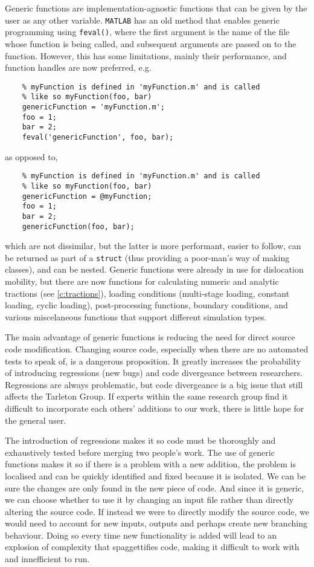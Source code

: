 Generic functions are implementation-agnostic functions that can be given by the user as any other variable. \texttt{MATLAB} has an old method that enables generic programming using \texttt{feval()}, where the first argument is the name of the file whose function is being called, and subsequent arguments are passed on to the function. However, this has some limitations, mainly their performance, and function handles are now preferred, e.g.
\begin{verbatim}
    % myFunction is defined in 'myFunction.m' and is called 
    % like so myFunction(foo, bar)
    genericFunction = 'myFunction.m'; 
    foo = 1;
    bar = 2;
    feval('genericFunction', foo, bar);
\end{verbatim}
as opposed to,
\begin{verbatim}
    % myFunction is defined in 'myFunction.m' and is called 
    % like so myFunction(foo, bar)
    genericFunction = @myFunction; 
    foo = 1;
    bar = 2;
    genericFunction(foo, bar);
\end{verbatim}
which are not dissimilar, but the latter is more performant, easier to follow, can be returned as part of a \texttt{struct} (thus providing a poor-man's way of making classes), and can be nested. Generic functions were already in use for dislocation mobility, but there are now functions for calculating numeric and analytic tractions (see \cref{c:tractions}), loading conditions (multi-stage loading, constant loading, cyclic loading), post-processing functions, boundary conditions, and various miscelaneous functions that support different simulation types.

The main advantage of generic functions is reducing the need for direct source code modification. Changing source code, especially when there are no automated tests to speak of, is a dangerous proposition. It greatly increases the probability of introducing regressions (new bugs) and code divergeance between researchers. Regressions are always problematic, but code divergeance is a big issue that still affects the Tarleton Group. If experts within the same research group find it difficult to incorporate each others' additions to our work, there is little hope for the general user.

The introduction of regressions makes it so code must be thoroughly and exhaustively tested before merging two people's work. The use of generic functions makes it so if there is a problem with a new addition, the problem is localised and can be quickly identified and fixed because it is isolated. We can be sure the changes are only found in the new piece of code. And since it is generic, we can choose whether to use it by changing an input file rather than directly altering the source code. If instead we were to directly modify the source code, we would need to account for new inputs, outputs and perhaps create new branching behaviour. Doing so every time new functionality is added will lead to an explosion of complexity that spaggettifies code, making it difficult to work with and innefficient to run.

